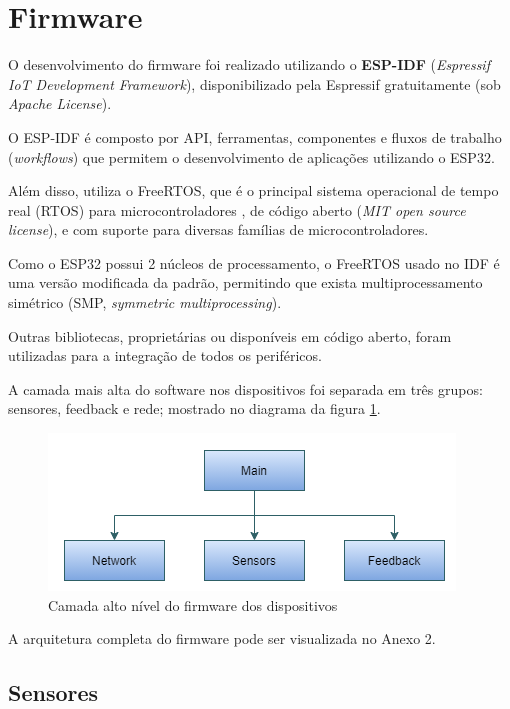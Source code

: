 \documentclass[../monografia.tex]{subfiles}
\begin{document}
\section{Firmware} \label{firmware}

O desenvolvimento do firmware foi realizado utilizando o \textbf{ESP-IDF} (\textit{Espressif IoT Development Framework}), disponibilizado pela Espressif \cite{esp-idf} gratuitamente (sob \textit{Apache License}). 

O ESP-IDF é composto por API, ferramentas, componentes e fluxos de trabalho (\textit{workflows}) que permitem o desenvolvimento de aplicações utilizando o ESP32. 

Além disso, utiliza o FreeRTOS, que é o principal sistema operacional de tempo real (RTOS) para microcontroladores \cite{freertos}, de código aberto (\textit{MIT open source license}), e com suporte para diversas famílias de microcontroladores.

Como o ESP32 possui 2 núcleos de processamento, o FreeRTOS usado no IDF é uma versão modificada da padrão, permitindo que exista multiprocessamento simétrico (SMP, \textit{symmetric multiprocessing}).

Outras bibliotecas, proprietárias ou disponíveis em código aberto, foram utilizadas para a integração de todos os periféricos. 

A camada mais alta do software nos dispositivos foi separada em três grupos: sensores, feedback e rede; mostrado no diagrama da figura \ref{fig:fw-arch-1}. %

\begin{figure}[h!]
	\centering
	\includegraphics[scale=0.8]{fw-arch-1}
	\caption{Camada alto nível do firmware dos dispositivos}
	\label{fig:fw-arch-1}
\end{figure}

A arquitetura completa do firmware pode ser visualizada no Anexo 2. %

\subsection{Sensores} %
\end{document}
